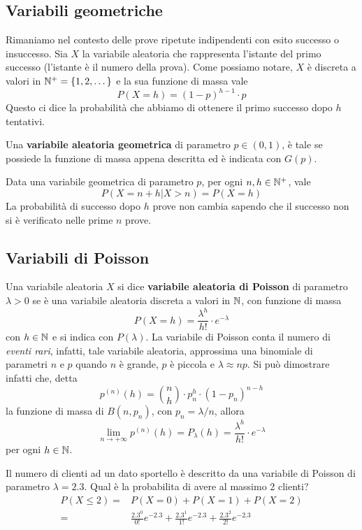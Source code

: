 \subsection{Variabili geometriche}
Rimaniamo nel contesto delle prove ripetute indipendenti con esito successo o insuccesso. Sia $X$
la variabile aleatoria che rappresenta l'istante del primo successo (l'istante è il numero della
prova). Come possiamo notare, $X$ è discreta a valori in $\mathbb{N}^+ = \{ 1, 2, \dots \}$ e la sua
funzione di massa vale
\[ P(X = h) = (1-p)^{h-1} \cdot p \]
Questo ci dice la probabilità che abbiamo di ottenere il primo successo dopo $h$ tentativi.

Una \textbf{variabile aleatoria geometrica} di parametro $p \in (0,1)$, è tale se possiede la
funzione di massa appena descritta ed è indicata con $G(p)$.

\begin{proposition}
	Data una variabile geometrica di parametro $p$, per ogni $n,h \in \mathbb{N}^+$, vale
	\[ P(X = n + h | X > n) = P(X = h) \]
	La probabilità di successo dopo $h$ prove non cambia sapendo che il successo non si è
	verificato nelle prime $n$ prove.
\end{proposition}

\subsection{Variabili di Poisson}
Una variabile aleatoria $X$ si dice \textbf{variabile aleatoria di Poisson} di parametro
$\lambda > 0$ se è una variabile aleatoria discreta a valori in $\mathbb{N}$, con funzione di massa
\[ P(X = h) = \frac{\lambda^h}{h!} \cdot e^{-\lambda} \]
con $h \in \mathbb{N}$ e si indica con $P(\lambda)$. La variabile di Poisson conta il numero di
\emph{eventi rari}, infatti, tale variabile aleatoria, approssima una binomiale di parametri $n$ e
$p$ quando $n$ è grande, $p$ è piccola e $\lambda \approx np$. Si può dimostrare infatti che, detta
\[ p^{(n)} (h) = \binom{n}{h} \cdot p_n^h \cdot \left( 1-p_n \right)^{n-h} \]
la funzione di massa di $B(n, p_n)$, con $p_n = \lambda / n$, allora
\[ \lim_{n \to +\infty} p^{(n)} (h) = P_\lambda (h) = \frac{\lambda^h}{h!} \cdot e^{-\lambda} \]
per ogni $h \in \mathbb{N}$.

\begin{example}
	Il numero di clienti ad un dato sportello è descritto da una variabile di Poisson di parametro
	$\lambda = 2.3$. Qual è la probabilita di avere al massimo 2 clienti?
	\begin{align*}
		P(X \leq 2) = & P(X = 0) + P(X = 1) + P(X = 2)                          \\
		=             & \frac{2.3^0}{0!} e^{-2.3} + \frac{2.3^1}{1!} e^{-2.3} +
		\frac{2.3^2}{2!} e^{-2.3}
	\end{align*}
\end{example}

